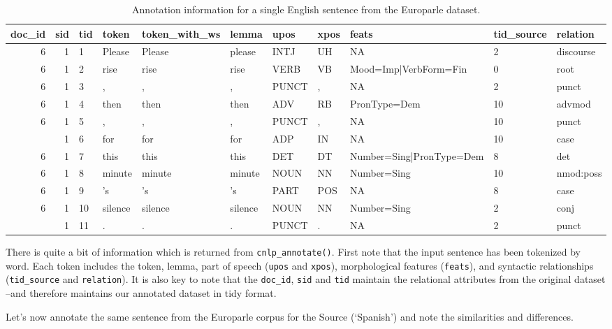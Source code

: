 \documentclass[
  letterpaper,
]{scrbook}
\begin{document}
\hypertarget{tbl-td-generation-test-annotation-english}{}
\begin{table}
\caption{\label{tbl-td-generation-test-annotation-english}Annotation information for a single English sentence from the Europarle
dataset. }\tabularnewline

\centering
\begin{tabular}{rrlllllllll}
\toprule
doc\_id & sid & tid & token & token\_with\_ws & lemma & upos & xpos & feats & tid\_source & relation\\
\midrule
6 & 1 & 1 & Please & Please & please & INTJ & UH & NA & 2 & discourse\\
6 & 1 & 2 & rise & rise & rise & VERB & VB & Mood=Imp|VerbForm=Fin & 0 & root\\
6 & 1 & 3 & , & , & , & PUNCT & , & NA & 2 & punct\\
6 & 1 & 4 & then & then & then & ADV & RB & PronType=Dem & 10 & advmod\\
6 & 1 & 5 & , & , & , & PUNCT & , & NA & 10 & punct\\
\addlinespace
6 & 1 & 6 & for & for & for & ADP & IN & NA & 10 & case\\
6 & 1 & 7 & this & this & this & DET & DT & Number=Sing|PronType=Dem & 8 & det\\
6 & 1 & 8 & minute & minute & minute & NOUN & NN & Number=Sing & 10 & nmod:poss\\
6 & 1 & 9 & 's & 's & 's & PART & POS & NA & 8 & case\\
6 & 1 & 10 & silence & silence & silence & NOUN & NN & Number=Sing & 2 & conj\\
\addlinespace
6 & 1 & 11 & . & . & . & PUNCT & . & NA & 2 & punct\\
\bottomrule
\end{tabular}
\end{table}

There is quite a bit of information which is returned from
\texttt{cnlp\_annotate()}. First note that the input sentence has been
tokenized by word. Each token includes the token, lemma, part of speech
(\texttt{upos} and \texttt{xpos}), morphological features
(\texttt{feats}), and syntactic relationships (\texttt{tid\_source} and
\texttt{relation}). It is also key to note that the \texttt{doc\_id},
\texttt{sid} and \texttt{tid} maintain the relational attributes from
the original dataset --and therefore maintains our annotated dataset in
tidy format.

Let's now annotate the same sentence from the Europarle corpus for the
Source (`Spanish') and note the similarities and differences.
\end{document}
